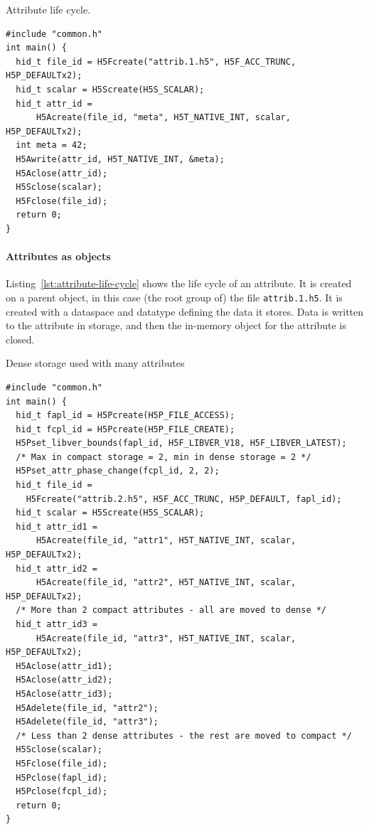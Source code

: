 \begin{listing}
\centering
\caption{Attribute life cycle.}
\label{lst:attribute-life-cycle}
\begin{verbatim}
#include "common.h"
int main() {
  hid_t file_id = H5Fcreate("attrib.1.h5", H5F_ACC_TRUNC, H5P_DEFAULTx2);
  hid_t scalar = H5Screate(H5S_SCALAR);
  hid_t attr_id =
      H5Acreate(file_id, "meta", H5T_NATIVE_INT, scalar, H5P_DEFAULTx2);
  int meta = 42;
  H5Awrite(attr_id, H5T_NATIVE_INT, &meta);
  H5Aclose(attr_id);
  H5Sclose(scalar);
  H5Fclose(file_id);
  return 0;
}
\end{verbatim}
\end{listing}

\paragraph{Attributes as objects} Listing~\ref{lst:attribute-life-cycle} shows the life cycle of an attribute. It is created on a parent object, in this case (the root group of) the file \texttt{attrib.1.h5}. It is created with a dataspace and datatype defining the data it stores. Data is written to the attribute in storage, and then the in-memory object for the attribute is closed. 

\begin{listing}
\centering
\caption{Dense storage used with many attributes}
\label{lst:attribute-dense-storage-many}
\begin{verbatim}
#include "common.h"
int main() {
  hid_t fapl_id = H5Pcreate(H5P_FILE_ACCESS);
  hid_t fcpl_id = H5Pcreate(H5P_FILE_CREATE);
  H5Pset_libver_bounds(fapl_id, H5F_LIBVER_V18, H5F_LIBVER_LATEST);
  /* Max in compact storage = 2, min in dense storage = 2 */
  H5Pset_attr_phase_change(fcpl_id, 2, 2);
  hid_t file_id = 
    H5Fcreate("attrib.2.h5", H5F_ACC_TRUNC, H5P_DEFAULT, fapl_id);
  hid_t scalar = H5Screate(H5S_SCALAR);
  hid_t attr_id1 =
      H5Acreate(file_id, "attr1", H5T_NATIVE_INT, scalar, H5P_DEFAULTx2);
  hid_t attr_id2 =
      H5Acreate(file_id, "attr2", H5T_NATIVE_INT, scalar, H5P_DEFAULTx2);
  /* More than 2 compact attributes - all are moved to dense */
  hid_t attr_id3 =
      H5Acreate(file_id, "attr3", H5T_NATIVE_INT, scalar, H5P_DEFAULTx2);
  H5Aclose(attr_id1);
  H5Aclose(attr_id2);
  H5Aclose(attr_id3);
  H5Adelete(file_id, "attr2");
  H5Adelete(file_id, "attr3");
  /* Less than 2 dense attributes - the rest are moved to compact */
  H5Sclose(scalar);
  H5Fclose(file_id);
  H5Pclose(fapl_id);
  H5Pclose(fcpl_id);
  return 0;
}
\end{verbatim}
\end{listing}

